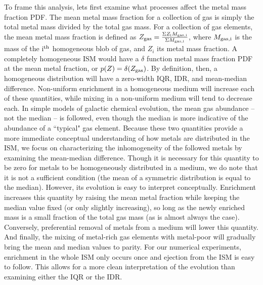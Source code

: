 To frame this analysis, lets first examine what processes affect the metal mass fraction PDF. The mean metal mass fraction for a collection of gas is simply the total metal mass divided by the total gas mass. For a collection of gas elements, the mean metal mass fraction is defined as $Z_{\rm gas} = \frac{ \Sigma Z_{\rm i}M_{\rm gas,i}}{\Sigma M_{\rm gas,i}}$, where $M_{\rm gas,i}$ is the mass of the i$^{\rm th}$ homogeneous blob of gas, and $Z_{i}$ its metal mass fraction. A completely homogeneous ISM would have a $\delta$ function metal mass fraction PDF at the mean metal fraction, or $p(Z) = \delta(Z_{\rm gas})$. By definition, then, a homogeneous distribution will have a zero-width IQR, IDR, and mean-median difference. Non-uniform enrichment in a homogeneous medium will increase each of these quantities, while mixing in a non-uniform medium will tend to decrease each. In simple models of galactic chemical evolution, the mean gas abundance -- not the median -- is followed, even though the median is more indicative of the abundance of a ``typical" gas element. Because these two quantities provide a more immediate conceptual understanding of how metals are distributed in the ISM, we focus on characterizing the inhomogeneity of the followed metals by examining the mean-median difference. Though it is necessary for this quantity to be zero for metals to be homogeneously distributed in a medium, we do note that it is not a sufficient condition (the mean of a symmetric distribution is equal to the median). However, its evolution is easy to interpret conceptually. Enrichment increases this quantity by raising the mean metal fraction while keeping the median value fixed (or only slightly increasing), so long as the newly enriched mass is a small fraction of the total gas mass (as is almost always the case). Conversely, preferential removal of metals from a medium will lower this quantity. And finally, the mixing of metal-rich gas elements with metal-poor will gradually bring the mean and median values to parity. For our numerical experiments, enrichment in the whole ISM only occurs once and ejection from the ISM is easy to follow. This allows for a more clean interpretation of the evolution than examining either the IQR or the IDR.

